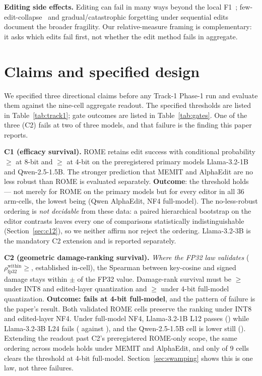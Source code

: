 \documentclass[preprint,12pt]{elsarticle}
\begin{document}
\textbf{Editing side effects.} Editing can fail in many ways beyond the local
F1~\cite{pitfalls2024}; few-edit-collapse~\cite{butterfly2024} and
gradual/catastrophic forgetting under sequential edits~\cite{seqforget2024} document
the broader fragility. Our relative-measure framing is complementary: it asks which
edits fail first, not whether the edit method fails in aggregate.

\section{Claims and specified design}
\label{sec:claims}

We specified three directional claims before any Track-1 Phase-1 run and evaluate them
against the nine-cell aggregate readout. The specified thresholds are listed in
Table~\ref{tab:track1}; gate outcomes are listed in Table~\ref{tab:gates}. One of the
three (C2) fails at two of three models, and that failure is the finding this paper
reports.

\textbf{C1 (efficacy survival).} ROME retains edit success with conditional probability
$\geq$\pEsrSurvEightThreshold{} at 8-bit and $\geq$\pEsrSurvFourThreshold{} at 4-bit on
the preregistered primary models Llama-3.2-1B and Qwen-2.5-1.5B. The stronger
prediction that MEMIT and AlphaEdit are no less robust than ROME is evaluated
separately. \textbf{Outcome}: the threshold holds --- not merely for ROME on the primary
models but for every editor in all 36 arm-cells, the lowest being \pMinCondAll{} (Qwen
AlphaEdit, NF4 full-model). The no-less-robust ordering is \emph{not decidable} from
these data: a paired hierarchical bootstrap on the editor contrasts leaves every one of
\pBootNContrasts{} comparisons statistically indistinguishable (Section~\ref{sec:c12}),
so we neither affirm nor reject the ordering. Llama-3.2-3B is the mandatory C2 extension
and is reported separately.

\textbf{C2 (geometric damage-ranking survival).} \textit{Where the FP32 law validates}
($\rho_{\mathrm{fp32}}^{\mathrm{within}} \geq$\pFpThreshold{}, established in-cell),
the Spearman between key-cosine and signed damage stays within $\pm$\pDeltaRhoTolerance{}
of the FP32 value. Damage-rank survival must be $\geq$\pRankSurvEightThreshold{} under
INT8 and edited-layer quantization and $\geq$\pRankSurvFourThreshold{} under 4-bit
full-model quantization. \textbf{Outcome: fails at 4-bit full-model}, and the pattern of
failure is the paper's result. Both validated ROME cells preserve the ranking under INT8
and edited-layer NF4. Under full-model NF4, Llama-3.2-1B L12 passes
(\pPrimarynfFourdqFullModelRankSurv{}) while Llama-3.2-3B L24 fails
(\pSecondnfFourdqFullModelRankSurv{} against \pRankSurvFourThreshold{}), and the
Qwen-2.5-1.5B cell is lower still (\pFlatNfFMQOneRome{}). Extending the readout past
C2's preregistered ROME-only scope, the same ordering across models holds under MEMIT and
AlphaEdit, and only \pNPassNfFM{} of 9 cells clears the threshold at 4-bit full-model.
Section~\ref{sec:swamping} shows this is one law, not three failures.
\end{document}
